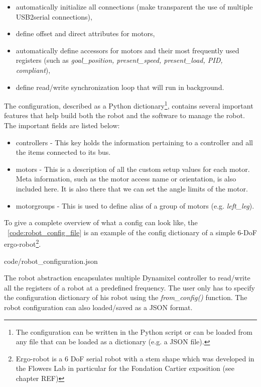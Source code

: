 \begin{itemize}
    \item automatically initialize all connections (make transparent the use of multiple USB2serial connections),
    \item define offset and direct attributes for motors,
    \item automatically define accessors for motors and their most frequently used registers (such as \emph{goal\_position, present\_speed, present\_load, PID, compliant}),
    \item define read/write synchronization loop that will run in background.
\end{itemize}

The configuration, described as a Python dictionary\footnote{The configuration can be written in the Python script or can be loaded from any file that can be loaded as a dictionary (e.g. a JSON file).}, contains several important features that help build both the robot and the software to manage the robot. The important fields are listed below:

\begin{itemize}
    \item controllers - This key holds the information pertaining to a controller and all the items connected to its bus.
    \item motors - This is a description of all the custom setup values for each motor. Meta information, such as the motor access name or orientation, is also included here. It is also there that we can set the angle limits of the motor.
    \item motorgroups - This is used to define alias of a group of motors (e.g. \emph{left\_leg}).
\end{itemize}

To give a complete overview of what a config can look like, the \codename~\ref{code:robot_config_file} is an example of the config dictionary of a simple 6-DoF ergo-robot\footnote{Ergo-robot is a 6 DoF serial robot with a stem shape which was developed in the Flowers Lab in particular for the Fondation Cartier exposition (see chapter REF)}.


    {code/robot_configuration.json}


The robot abstraction encapsulates multiple Dynamixel controller to read/write all the registers of a robot at a predefined frequency. The user only has to specify the configuration dictionary of his robot using the \emph{from\_config()} function. The robot configuration can also loaded/saved as a JSON format.


